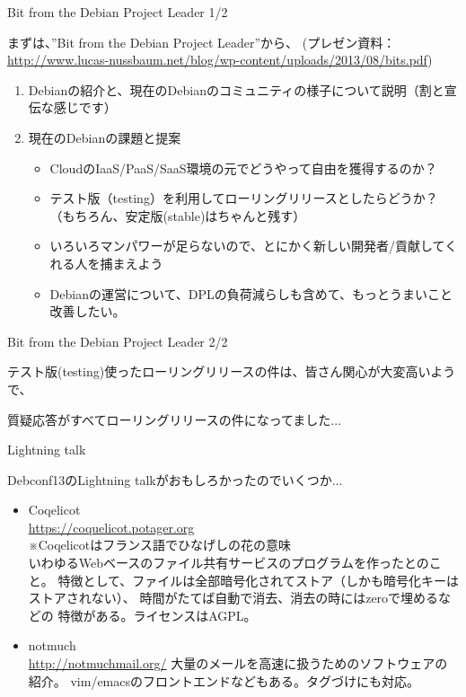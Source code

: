 \begin{frame}{Bit from the Debian Project Leader 1/2}

 まずは、''Bit from the Debian Project Leader''から、
(プレゼン資料：\url{http://www.lucas-nussbaum.net/blog/wp-content/uploads/2013/08/bits.pdf})
\begin{enumerate}
\item Debianの紹介と、現在のDebianのコミュニティの様子について説明（割と宣伝な感じです）
\item 現在のDebianの課題と提案
\begin{itemize}
  \item CloudのIaaS/PaaS/SaaS環境の元でどうやって自由を獲得するのか？
  \item テスト版（testing）を利用してローリングリリースとしたらどうか？（もちろん、安定版(stable)はちゃんと残す）
  \item いろいろマンパワーが足らないので、とにかく新しい開発者/貢献してくれる人を捕まえよう
　\item Debianの運営について、DPLの負荷減らしも含めて、もっとうまいこと改善したい。
\end{itemize}
\end{enumerate}

\end{frame}

\begin{frame}{Bit from the Debian Project Leader 2/2}

テスト版(testing)使ったローリングリリースの件は、皆さん関心が大変高いようで、

\begin{center}
\LARGE
質疑応答がすべてローリングリリースの件になってました...
\end{center}

\end{frame}

\begin{frame}{Lightning talk}

 Debconf13のLightning talkがおもしろかったのでいくつか...

\begin{itemize}
\item Coqelicot \\
\url{https://coquelicot.potager.org}\\
※Coqelicotはフランス語でひなげしの花の意味\\
いわゆるWebベースのファイル共有サービスのプログラムを作ったとのこと。
特徴として、ファイルは全部暗号化されてストア（しかも暗号化キーはストアされない）、
時間がたてば自動で消去、消去の時にはzeroで埋めるなどの
特徴がある。ライセンスはAGPL。
\item notmuch \\
\url{http://notmuchmail.org/}
大量のメールを高速に扱うためのソフトウェアの紹介。
vim/emacsのフロントエンドなどもある。タグづけにも対応。
\end{itemize}

\end{frame}

